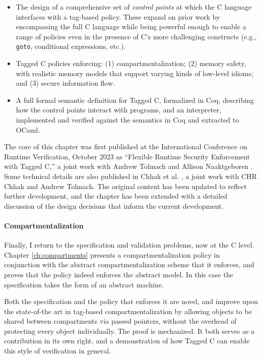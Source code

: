 \documentclass{report}
\begin{document}
\begin{itemize}
\item The design of a comprehensive set of {\em control points} at which the C language interfaces
  with a tag-based policy. These expand on prior work by encompassing the full C language
  while being powerful enough to enable a range of policies even in the presence of C's more
  challenging constructs (e.g., {\tt goto}, conditional expressions, etc.).
\item Tagged C policies enforcing: (1) compartmentalization;
  (2) memory safety, with realistic memory models that support varying kinds of low-level idioms;
  and (3) secure information flow.
\item A full formal semantic definition for Tagged C, formalized in Coq, describing how the
  control points interact with programs, and an interpreter, implemented and verified against
  the semantics in Coq and extracted to OCaml.
\end{itemize}

The core of this chapter was first published at the International Conference on Runtime Verification,
October 2023 as ``Flexible Runtime Security Enforcement with Tagged C,'' a joint work
with Andrew Tolmach and Allison Naaktgeboren \cite{Anderson23:TaggedC}. Some technical
details are also published in Chhak et al. \cite{}, a joint work with CHR Chhak and Andrew Tolmach.
The original content has been updated to reflect further development, and the chapter has been
extended with a detailed discussion of the design decisions that inform the current development.

\paragraph{Compartmentalization}

Finally, I return to the specification and validation problems, now at the C level. Chapter
\ref{ch:compartments} presents a compartmentalization policy in conjunction with the abstract
compartmentalization scheme that it enforces, and proves that the policy indeed enforces the
abstract model. In this case the specification takes the form of an abstract machine.

Both the specification and the policy that enforces it are novel, and improve upon the
state-of-the art in tag-based compartmentalization by allowing objects to be shared between
compartments via passed pointers, without the overhead of protecting every object individually.
The proof is mechanized. It both serves as a contribution in its own right, and a demonstration
of how Tagged C can enable this style of verification in general. 
\end{document}
